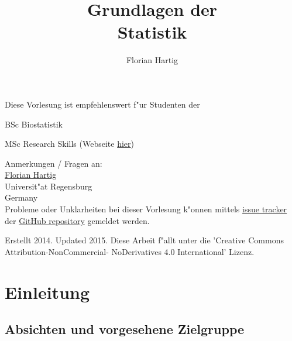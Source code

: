 \documentclass[a4paper,twoside]{tufte-book}\usepackage[]{graphicx}\usepackage[]{color}
\title{Grundlagen der\\Statistik}
\author{Florian Hartig}
\begin{document}

\let\cleardoublepage\clearpage %
\maketitle


\thispagestyle{empty}
\null

\begin{fullwidth}
Diese Vorlesung ist empfehlenswert f"ur Studenten der

\begin{itemize*}
  \item BSc Biostatistik
  \item MSc Research Skills (Webseite \href{http://florianhartig.github.io/ResearchSkills/}{hier})
\end{itemize*}

\vspace{0.5cm}

Anmerkungen / Fragen an:\\[0.5cm]
\href{https://florianhartig.wordpress.com/}{Florian Hartig}\\
Universit"at Regensburg\\
Germany\\[0.5cm]

Probleme oder Unklarheiten bei dieser Vorlesung k"onnen mittels \href{https://github.com/florianhartig/Statistics/issues}{issue tracker} der \href{https://github.com/florianhartig/Statistics/tree/master/EssentialStatistics}{GitHub repository} gemeldet werden. 

\end{fullwidth}


\vfill
\begin{fullwidth}
Erstellt 2014. Updated 2015. Diese Arbeit f"allt unter die 'Creative Commons Attribution-NonCommercial- NoDerivatives 4.0 International' Lizenz.
\end{fullwidth}


\newpage
\tableofcontents

\chapter{Einleitung} %

	\section{Absichten und vorgesehene Zielgruppe}
	
\end{document}
